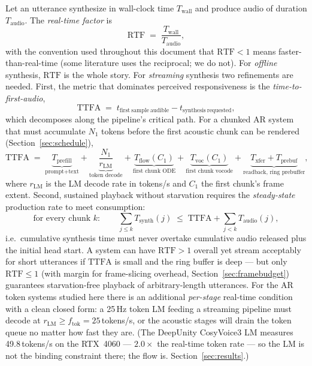 \documentclass[11pt,a4paper]{article}
\newcommand{\RTF}{\ensuremath{\mathrm{RTF}}}
\newcommand{\TTFA}{\ensuremath{\mathrm{TTFA}}}
\newcommand{\ftok}{\ensuremath{f_{\mathrm{tok}}}}   %
\begin{document}
Let an utterance synthesize in wall-clock time $T_{\mathrm{wall}}$ and produce audio of
duration $T_{\mathrm{audio}}$. The \emph{real-time factor} is
\begin{equation}
\RTF \;=\; \frac{T_{\mathrm{wall}}}{T_{\mathrm{audio}}},
\label{eq:rtf}
\end{equation}
with the convention used throughout this document that $\RTF < 1$ means
faster-than-real-time (some literature uses the reciprocal; we do not). For \emph{offline}
synthesis, \RTF{} is the whole story. For \emph{streaming} synthesis two refinements are
needed. First, the metric that dominates perceived responsiveness is the
\emph{time-to-first-audio},
\begin{equation}
\TTFA \;=\; t_{\mathrm{first\ sample\ audible}} - t_{\mathrm{synthesis\ requested}},
\label{eq:ttfa}
\end{equation}
which decomposes along the pipeline's critical path. For a chunked AR system that must
accumulate $N_1$ tokens before the first acoustic chunk can be rendered
(Section~\ref{sec:schedule}),
\begin{equation}
\TTFA \;=\;
\underbrace{T_{\mathrm{prefill}}}_{\text{prompt}+\text{text}}
+ \underbrace{\frac{N_1}{r_{\mathrm{LM}}}}_{\text{token decode}}
+ \underbrace{T_{\mathrm{flow}}(C_1)}_{\text{first chunk ODE}}
+ \underbrace{T_{\mathrm{voc}}(C_1)}_{\text{first chunk vocode}}
+ \underbrace{T_{\mathrm{xfer}} + T_{\mathrm{prebuf}}}_{\text{readback, ring prebuffer}},
\label{eq:ttfa-decomp}
\end{equation}
where $r_{\mathrm{LM}}$ is the LM decode rate in tokens/s and $C_1$ the first chunk's
frame extent. Second, sustained playback without starvation requires the
\emph{steady-state} production rate to meet consumption:
\begin{equation}
\text{for every chunk } k:\qquad
\sum_{j \le k} T_{\mathrm{synth}}(j) \;\le\; \TTFA + \sum_{j < k} T_{\mathrm{audio}}(j),
\label{eq:no-starve}
\end{equation}
i.e.\ cumulative synthesis time must never overtake cumulative audio released plus the
initial head start. A system can have $\RTF > 1$ overall yet stream acceptably for short
utterances if \TTFA{} is small and the ring buffer is deep --- but only $\RTF \le 1$
(with margin for frame-slicing overhead, Section~\ref{sec:framebudget}) guarantees
starvation-free playback of arbitrary-length utterances. For the AR token systems studied
here there is an additional \emph{per-stage} real-time condition with a clean closed
form: a 25\,Hz token LM feeding a streaming pipeline must decode at
$r_{\mathrm{LM}} \ge \ftok = 25$\,tokens/s, or the acoustic stages will drain the token
queue no matter how fast they are. (The DeepUnity CosyVoice3 LM measures
49.8\,tokens/s on the RTX~4060 --- $2.0\times$ the real-time token rate --- so the LM is
not the binding constraint there; the flow is. Section~\ref{sec:results}.)
\end{document}
